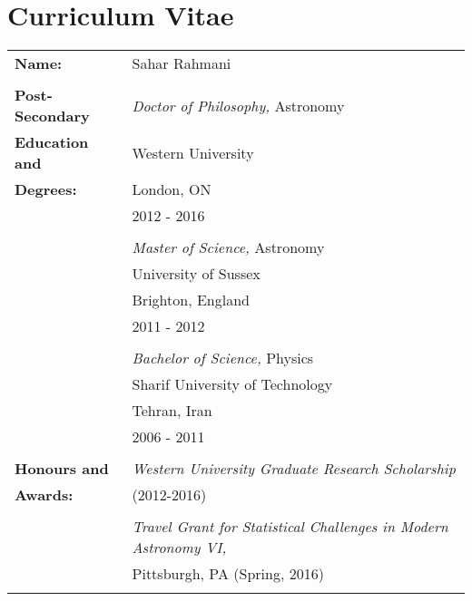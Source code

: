 \documentclass[12pt,twoside]{report}
\numberwithin{figure}{chapter}
\newcommand{\firstname}{Sahar}
\newcommand{\lastname}{Rahmani}
\begin{document}
% 
% 


 \begin{appendices}
 
 
 

 \end{appendices}


\chapter*{Curriculum Vitae}
\begin{table}[ht]
\begin{tabular}{ll}
\textbf{Name:} & \firstname{} \lastname\\\\
\textbf{Post-Secondary} & {\sl Doctor of Philosophy,} Astronomy \\
\textbf{Education and}& Western University\\
\textbf{Degrees:}& London, ON\\
& 2012 - 2016\\\\
&{\sl Master of Science,} Astronomy \\
& University of Sussex \\
& Brighton, England\\
& 2011 - 2012\\\\
& {\sl Bachelor of Science,} Physics \\
& Sharif University of Technology \\
& Tehran, Iran \\
& 2006 - 2011\\\\
\textbf{Honours and}& {\sl Western University Graduate Research Scholarship}\\
\textbf{Awards:}&(2012-2016)\\\\
& {\sl Travel Grant for Statistical Challenges in Modern Astronomy VI,}\\
&  Pittsburgh, PA (Spring, 2016)\\\\

\end{tabular}
\end{table}
\end{document}
